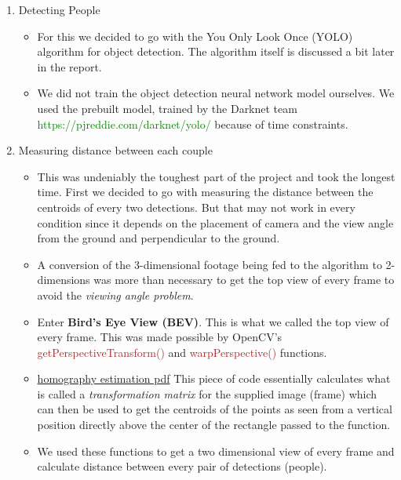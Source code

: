 \documentclass[a4paper]{article}
\begin{document}
\begin{enumerate}
    \item Detecting People
          \begin{itemize}
              \item For this we decided to go with the You Only Look Once (YOLO) algorithm for object detection. The algorithm itself is discussed a bit later in the report.
              \item We did not train the object detection neural network model ourselves. We used the prebuilt model, trained by the Darknet team \textcolor{green}{https://pjreddie.com/darknet/yolo/} because of time constraints.
          \end{itemize}

    \item Measuring distance between each couple
          \begin{itemize}
              \item This was undeniably the toughest part of the project and took the longest time. First we decided to go with measuring the distance between the centroids of every two detections. But that may not work in every condition since it depends on the placement of camera and the view angle from the ground and perpendicular to the ground.
              \item A conversion of the 3-dimensional footage being fed to the algorithm to 2-dimensions was more than necessary to get the top view of every frame to avoid the \textit{viewing angle problem}.
              \item Enter \textbf{Bird's Eye View (BEV)}. This is what we called the top view of every frame. This was made possible by OpenCV's \textcolor{brown}{getPerspectiveTransform()} and \textcolor{brown}{warpPerspective()} functions.
                    
              \item \textcolor{green}{\href{https://cseweb.ucsd.edu/classes/wi07/cse252a/homography_estimation/homography_estimation.pdf}{homography estimation pdf}} This piece of code essentially calculates what is called a \textit{transformation matrix}  for the supplied image (frame) which can then be used to get the centroids of the points as seen from a vertical position directly above the center of the rectangle passed to the function.
                    
              \item We used these functions to get a two dimensional view of every frame and calculate distance between every pair of detections (people).
          \end{itemize}


\end{enumerate}
\end{document}
